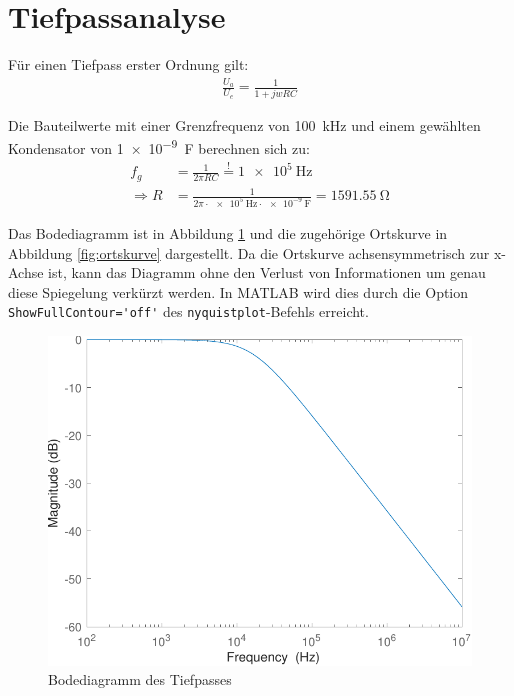 \documentclass[
    paper=a4,
    fontsize=10pt,
    DIV=calc,
    twocolumn,
    oneside,
]{scrartcl}
\begin{document}
\section{Tiefpassanalyse}
    Für einen Tiefpass erster Ordnung gilt:
    \begin{align}
        \label{eq:tp}
        \frac{U_a}{U_e} = \frac{1}{1+jwRC}
    \end{align}

    Die Bauteilwerte mit einer Grenzfrequenz von \SI{100}{\kilo\hertz} und einem gewählten Kondensator von \SI{1e-9}{\farad} berechnen sich zu:
    \begin{align}
        f_g &= \frac{1}{2 \pi RC} \overset{!}{=} \SI{1e5}{\hertz}\\
        \Rightarrow R&= \frac{1}{2 \pi \cdot \SI{e5}{\hertz} \cdot \SI{e-9}{\farad}} = \SI{1591.55}{\ohm}
    \end{align}

    Das Bodediagramm ist in Abbildung \ref{fig:bode} und die zugehörige Ortskurve in Abbildung \ref{fig:ortskurve} dargestellt. Da die Ortskurve achsensymmetrisch zur x-Achse ist, kann das Diagramm ohne den Verlust von Informationen um genau diese Spiegelung verkürzt werden. In MATLAB wird dies durch die Option \verb|ShowFullContour='off'| des \verb|nyquistplot|-Befehls erreicht.

    \begin{figure}
        \centering
        \includegraphics[width=\imagewidth]{../versuch1/bode.pdf}
        \caption{Bodediagramm des Tiefpasses}
        \label{fig:bode}
    \end{figure}
\end{document}
